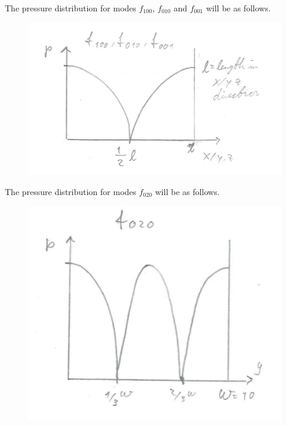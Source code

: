 \documentclass{article}
\begin{document}
The pressure distribution for modes $f_{100}$, $f_{010}$ and $f_{001}$ will be as follows.

\begin{figure}[H]
    \centering
    \includegraphics{figures/oving2_6_solution.png}
    \end{figure}

The pressure distribution for modes $f_{020}$ will be as follows.

\begin{figure}[H]
    \centering
    \includegraphics{figures/oving2_7_solution.png}
\end{figure}
\end{document}
